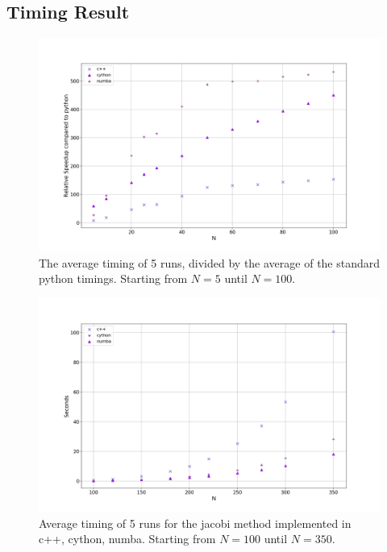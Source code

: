 \subsection{Timing Result}

\begin{figure}[H]
  \centering
  \includegraphics[width=1.0\textwidth]{../figures/avgspeed.png}
  \caption{ The average timing of 5 runs, divided by the average of the standard
  python timings. Starting from $N=5$ until $N=100$. }
  \label{fig:comp_python}
\end{figure}

\begin{figure}[H]
  \centering
  \includegraphics[width=1.0\textwidth]{../figures/speedComp_100_350.png}
  \caption{Average timing of 5 runs for the jacobi method implemented in c++, cython, numba. Starting from $N=100$ until $N=350$.}
  \label{fig:timing_largeN}
\end{figure}

